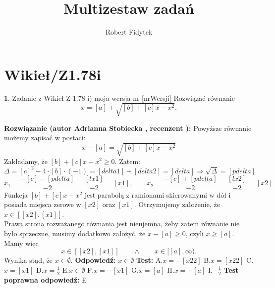 \documentclass[12pt, a4paper]{article}
\title{Multizestaw zadań}
\author{Robert Fidytek}
\date{}
\theoremstyle{definition} %
\newtheorem{zad}{}
\newcommand{\kategoria}[1]{\section{#1}} %
\newcommand{\zadStart}[1]{\begin{zad}#1\newline} %
\newcommand{\zadStop}{\end{zad}}   %
\newcommand{\rozwStart}[2]{\noindent \textbf{Rozwiązanie (autor #1 , recenzent #2): }\newline} %
\newcommand{\rozwStop}{\newline}                                            %
\newcommand{\odpStart}{\noindent \textbf{Odpowiedź:}\newline}    %
\newcommand{\odpStop}{\newline}                                             %
\newcommand{\testStart}{\noindent \textbf{Test:}\newline} %
\newcommand{\testStop}{\newline} %
\newcommand{\kluczStart}{\noindent \textbf{Test poprawna odpowiedź:}\newline} %
\newcommand{\kluczStop}{\newline} %
\begin{document}
\maketitle


\kategoria{Wikieł/Z1.78i}
\zadStart{Zadanie z Wikieł Z 1.78 i) moja wersja nr [nrWersji]}
Rozwiązać równanie
$$x=[a]+\sqrt{[b]+[c]x-x^2}.$$
\zadStop
\rozwStart{Adrianna Stobiecka}{}
 Powyższe równanie możemy zapisać w postaci:
$$x-[a]=\sqrt{[b]+[c]x-x^2}$$
Zakładamy, że $[b]+[c]x-x^2\geq0$. Zatem:
$$\Delta=[c]^2-4\cdot[b]\cdot(-1)=[delta1]+[delta2]=[delta]\Rightarrow\sqrt{\Delta}=[pdelta]$$
$$x_1=\frac{-[c]-[pdelta]}{-2}=\frac{[lx1]}{-2}=[x1],\qquad x_2=\frac{-[c]+[pdelta]}{-2}=\frac{[lx2]}{-2}=[x2]$$
Funkcja $[b]+[c]x-x^2$ jest parabolą z ramionami skierowanymi w dół i posiada miejsca zerowe w $[x2]$ oraz $[x1]$. Otrzymujemy założenie, że $x\in[[x2],[x1]]$.
\\Prawa strona rozważanego równania jest nieujemna, żeby zatem równanie nie było sprzeczne, musimy dodatkowo założyć, że $x-[a]\geq0$, czyli $x\geq[a]$.
Mamy więc
$$x\in[[x2],[x1]]\qquad\land\qquad x\in[[a],\infty).$$
Wynika stąd, że $x\in\emptyset$.
\rozwStop
\odpStart
$x\in\emptyset$
\odpStop
\testStart
A.$x=-[x22]$
B.$x=[x22]$
C.$x=[x1]$
D.$x=\frac{1}{2}$
E.$x\in\emptyset$
F.$x=-[x1]$
G.$x=[a]$
H.$x=-[a]$
I.$-\frac{1}{2}$
\testStop
\kluczStart
E
\kluczStop
\end{document}
